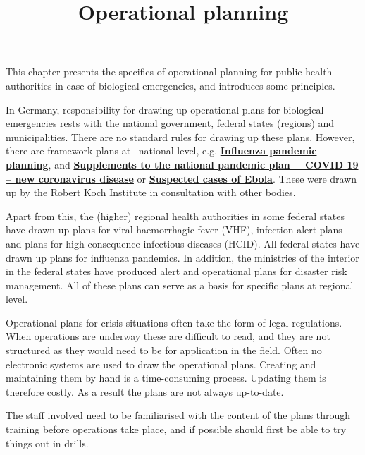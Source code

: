 \documentclass{article}
\begin{document}
\title{Operational planning}

\maketitle


This chapter presents the specifics of operational planning for public health authorities in case of biological emergencies, and introduces some principles.


In Germany, responsibility for drawing up operational plans for biological emergencies rests with the national government, federal states (regions) and municipalities. There are no standard rules for drawing up these plans. However, there are framework plans at  national level, e.g. \textbf{\href{https://www.rki.de/DE/Content/InfAZ/I/Influenza/Pandemieplanung/Pandemieplanung_Node.html}{Influenza pandemic planning}}, and\textbf{ }\textbf{\href{https://www.rki.de/DE/Content/InfAZ/N/Neuartiges_Coronavirus/Ergaenzung_Pandemieplan_Covid.html}{Supplements to the national pandemic plan – COVID 19 – new coronavirus disease}}\textbf{ }or \textbf{\href{https://www.rki.de/DE/Content/InfAZ/E/Ebola/Rahmenkonzept_Ebola.pdf}{Suspected cases of Ebola}}.\textbf{ }These were drawn up by the Robert Koch Institute in consultation with other bodies.


Apart from this, the (higher) regional health authorities in some federal states have drawn up plans for viral haemorrhagic fever (VHF), infection alert plans and plans for high consequence infectious diseases (HCID). All federal states have drawn up plans for influenza pandemics. In addition, the ministries of the interior in the federal states have produced alert and operational plans for disaster risk management. All of these plans can serve as a basis for specific plans at regional level.


Operational plans for crisis situations often take the form of legal regulations. When operations are underway these are difficult to read, and they are not structured as they would need to be for application in the field. Often no electronic systems are used to draw the operational plans. Creating and maintaining them by hand is a time-consuming process. Updating them is therefore costly. As a result the plans are not always up-to-date.


The staff involved need to be familiarised with the content of the plans through training before operations take place, and if possible should first be able to try things out in drills.
\end{document}
